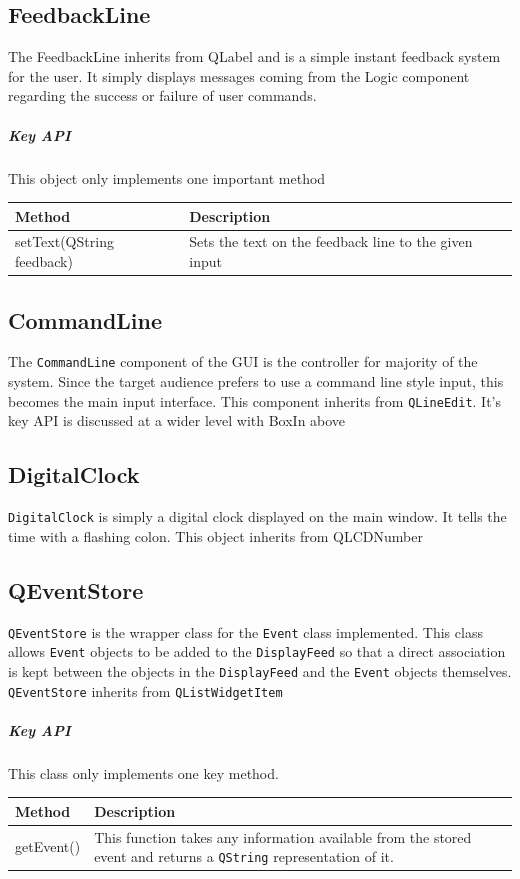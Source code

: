 \documentclass[12pt]{extarticle}
\begin{document}
\subsection{FeedbackLine}
The FeedbackLine inherits from QLabel and is a simple instant feedback system for the user. It simply displays messages coming from the Logic component regarding the success or failure of user commands.

\subparagraph{Key API} This object only implements one important method\\
\begin{tabular}{p{6cm} p{12cm}}
Method & Description\\
\hline
setText(QString feedback) & Sets the text on the feedback line to the given input\\
\end{tabular}

\subsection{CommandLine}
The \texttt{CommandLine} component of the GUI is the controller for majority of the system. Since the target audience prefers to use a command line style input, this becomes the main input interface. This component inherits from \texttt{QLineEdit}. It's key API is discussed at a wider level with BoxIn above\\

\subsection{DigitalClock}
\texttt{DigitalClock} is simply a digital clock displayed on the main window. It tells the time with a flashing colon. This object inherits from QLCDNumber\\

\subsection{QEventStore}
\texttt{QEventStore} is the wrapper class for the \texttt{Event} class implemented. This class allows \texttt{Event} objects to be added to the \texttt{DisplayFeed} so that a direct association is kept between the objects in the \texttt{DisplayFeed} and the \texttt{Event} objects themselves. \texttt{QEventStore} inherits from \texttt{QListWidgetItem}

\subparagraph{Key API} This class only implements one key method.\\
\begin{tabular}{p{6cm} p{12cm}}
Method & Description\\
\hline
getEvent() & This function takes any information available from the stored event and returns a \texttt{QString} representation of it.
\end{tabular}
\end{document}

